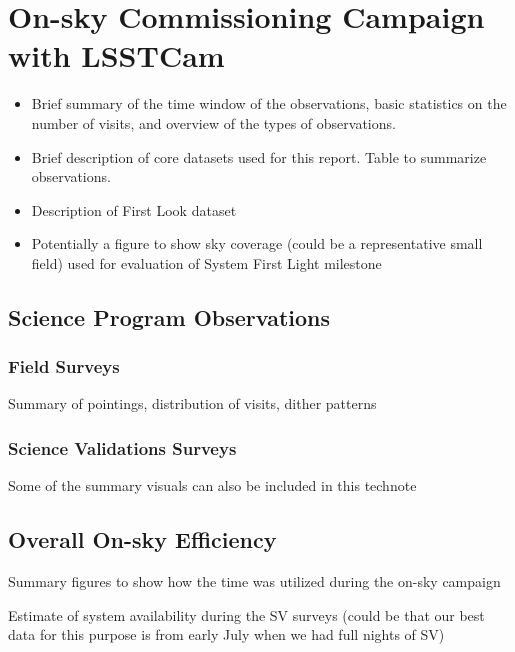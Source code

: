 \section{On-sky Commissioning Campaign with LSSTCam}
\label{sec:campaign}

\begin{itemize}
    \item Brief summary of the time window of the observations, basic statistics on the number of visits, and overview of the types of observations.
    \item Brief description of core datasets used for this report. Table to summarize observations.
    \item Description of First Look dataset
    \item Potentially a figure to show sky coverage (could be a representative small field) used for evaluation of System First Light milestone
\end{itemize}

\subsection{Science Program Observations}

\subsubsection{Field Surveys}

Summary of pointings, distribution of visits, dither patterns

\subsubsection{Science Validations Surveys}

Some of the summary visuals can also be included in this technote

\subsection{Overall On-sky Efficiency}

Summary figures to show how the time was utilized during the on-sky campaign

Estimate of system availability during the SV surveys (could be that our best data for this purpose is from early July when we had full nights of SV)